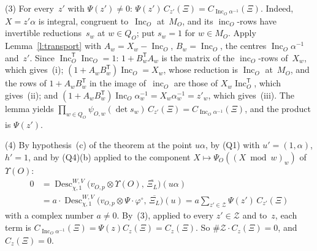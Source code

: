 \documentclass[11pt,a4paper]{article}
\newcommand{\m}[1]{\mbox{$#1$}}        %
\theoremstyle{plainx}
\theoremstyle{uprightx}
\newcommand{\incO}[1]{\operatorname{inc}_{#1}}
\newcommand{\IncM}[1]{\operatorname{Inc}_{#1}}
\newcommand{\psiO}[2]{\psi_{#1,#2}}
\newcommand{\MO}[1]{M_{#1}}
\newcommand{\QO}[1]{Q_{#1}}
\newcommand{\Ups}[1]{\Upsilon(#1)}
\newcommand{\PsiO}[2]{\Psi_{#1}(#2)}
\newcommand{\Desc}[4]{\operatorname{Desc}^{#1,#2}_{#3,#4}}
\newcommand{\pvO}[2]{v_{#1,#2}}
\newcommand{\coef}[2]{#2_{#1}}
\newcommand{\vacf}{\varphi^{\circ}}
\newcommand{\conj}[1]{\overline{#1}}
\begin{document}
(3) For every~$z'$ with \m{\Psi(z')\ne0}: \m{\Psi(z')\,C_{z'}(\Xi)=C_{\IncM{O}\alpha^{-1}}(\Xi)}. Indeed, \m{X=z'\alpha} is
integral, congruent to~\m{\IncM{O}} at~$\MO{O}$, and its $\incO{O}$-rows have invertible reductions~$s_{w}$ at
\m{w\in\QO{O}}; put \m{s_{w}=1} for \m{w\in\MO{O}}. Apply Lemma~\ref{l:transport} with \m{A_{w}=X_{w}-\IncM{O}},
\m{B_{w}=\IncM{O}}, the centres \m{\IncM{O}\alpha^{-1}} and~$z'$. Since \m{\IncM{O}^{\mathsf{T}}\IncM{O}=1}:
\m{1+B_{w}^{\mathsf{T}}A_{w}} is the matrix of the $\incO{O}$-rows of~$X_{w}$, which gives~(i);
\m{(1+A_{w}B_{w}^{\mathsf{T}})\IncM{O}=X_{w}}, whose reduction is \m{\IncM{O}} at~$\MO{O}$, and the rows of
\m{1+A_{w}B_{w}^{\mathsf{T}}} in the image of~$\incO{O}$ are those of \m{X_{w}\IncM{O}^{\mathsf{T}}}, which gives~(ii);
and \m{(1+A_{w}B_{w}^{\mathsf{T}})\IncM{O}\alpha_{w}^{-1}=X_{w}\alpha_{w}^{-1}=z'_{w}}, which gives~(iii). The lemma yields
\m{\prod_{w\in\QO{O}}\psiO{O}{w}(\det s_{w})\,C_{z'}(\Xi)=C_{\IncM{O}\alpha^{-1}}(\Xi)}, and the product is \m{\Psi(z')}.

(4) By hypothesis~(c) of the theorem at the point \m{u\alpha}, by (Q1) with \m{u'=(1,\alpha)}, \m{h'=1}, and by (Q4)(b)
applied to the component \m{X\mapsto\PsiO{O}{(X\bmod w)_{w}}} of~\m{\Ups{O}}:
\begin{align*}
0&=\Desc{W}{V}{\chi}{1}\bigl(\pvO{O}{p}\otimes\Ups{O},\,\conj{\coef{L}{\Xi}}\bigr)(u\alpha)\\
&=a\cdot\Desc{W}{V}{\chi}{1}\bigl(\pvO{O}{p}\otimes\Psi\cdot\vacf,\,\conj{\coef{L}{\Xi}}\bigr)(u)
=a\sum_{z'\in\mathcal{Z}}\Psi(z')\,C_{z'}(\Xi)
\end{align*}
with a complex number \m{a\ne0}. By~(3), applied to every \m{z'\in\mathcal{Z}} and to~$z$, each term is
\m{C_{\IncM{O}\alpha^{-1}}(\Xi)=\Psi(z)C_{z}(\Xi)=C_{z}(\Xi)}. So \m{\#\mathcal{Z}\cdot C_{z}(\Xi)=0}, and
\m{C_{z}(\Xi)=0}.
\end{document}
